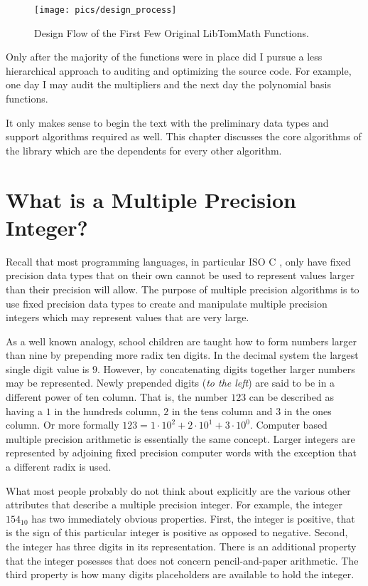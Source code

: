 \documentclass[b5paper]{book}
\begin{document}
\begin{center}
\begin{figure}[here]
\texttt{[image: pics/design\_process]}
\caption{Design Flow of the First Few Original LibTomMath Functions.}
\label{pic:design_process}
\end{figure}
\end{center}

Only after the majority of the functions were in place did I pursue a less hierarchical approach to auditing and optimizing
the source code.  For example, one day I may audit the multipliers and the next day the polynomial basis functions.  

It only makes sense to begin the text with the preliminary data types and support algorithms required as well.  
This chapter discusses the core algorithms of the library which are the dependents for every other algorithm.

\section{What is a Multiple Precision Integer?}
Recall that most programming languages, in particular ISO C \cite{ISOC}, only have fixed precision data types that on their own cannot 
be used to represent values larger than their precision will allow. The purpose of multiple precision algorithms is 
to use fixed precision data types to create and manipulate multiple precision integers which may represent values 
that are very large.  

As a well known analogy, school children are taught how to form numbers larger than nine by prepending more radix ten digits.  In the decimal system
the largest single digit value is $9$.  However, by concatenating digits together larger numbers may be represented.  Newly prepended digits 
(\textit{to the left}) are said to be in a different power of ten column.  That is, the number $123$ can be described as having a $1$ in the hundreds 
column, $2$ in the tens column and $3$ in the ones column.  Or more formally $123 = 1 \cdot 10^2 + 2 \cdot 10^1 + 3 \cdot 10^0$.  Computer based 
multiple precision arithmetic is essentially the same concept.  Larger integers are represented by adjoining fixed 
precision computer words with the exception that a different radix is used.

What most people probably do not think about explicitly are the various other attributes that describe a multiple precision 
integer.  For example, the integer $154_{10}$ has two immediately obvious properties.  First, the integer is positive, 
that is the sign of this particular integer is positive as opposed to negative.  Second, the integer has three digits in 
its representation.  There is an additional property that the integer posesses that does not concern pencil-and-paper 
arithmetic.  The third property is how many digits placeholders are available to hold the integer.  
\end{document}
